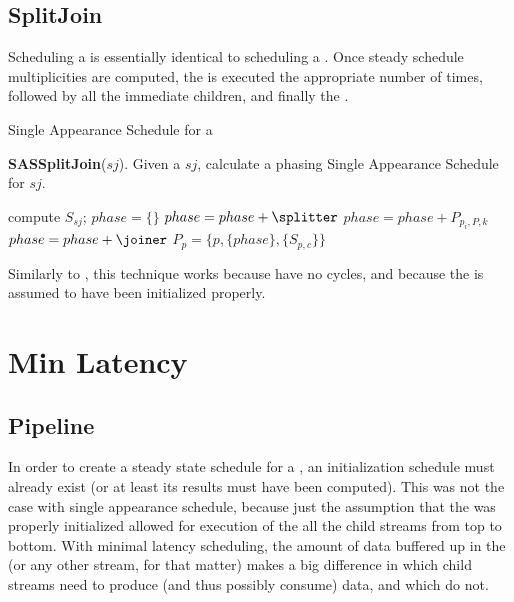 \subsection{SplitJoin}

Scheduling a {\splitjoin} is essentially identical to scheduling a
{\pipeline}.  Once steady schedule multiplicities are computed, the
{\splitter} is executed the appropriate number of times, followed by
all the immediate children, and finally the {\joiner}.

\begin{algorithm}
\label{alg:sa-pipeline} \caption{Single Appearance Schedule for a
{\splitjoin}} {\bf SASSplitJoin}($sj$).  Given a {\splitjoin} $sj$,
calculate a phasing Single Appearance Schedule for $sj$.
\begin{algorithmic}
\STATE compute $S_{sj}$; $phase = \{\}$  \STATE $phase = phase + {\splitter}$ \ENDFOR
{}   \STATE $phase = phase + P_{p_i, P, k}$ \ENDFOR
\ENDFOR \ENDFOR {} \STATE $phase
= phase + {\joiner}$ \ENDFOR \STATE $P_p = \{p, \{phase\},
\{S_{p,c}\}\}$
\end{algorithmic}
\end{algorithm}

Similarly to {\pipelines}, this technique works because {\splitjoins}
have no cycles, and because the {\splitjoin} is assumed to have been
initialized properly.

\section{Min Latency}

\subsection{Pipeline}

In order to create a steady state schedule for a {\pipeline}, an
initialization schedule must already exist (or at least its
results must have been computed).  This was not the case with
single appearance schedule, because just the assumption that the
{\pipeline} was properly initialized allowed for execution of the
all the child streams from top to bottom.  With minimal latency
scheduling, the amount of data buffered up in the {\pipeline} (or
any other stream, for that matter) makes a big difference in which
child streams need to produce (and thus possibly consume) data,
and which do not.

